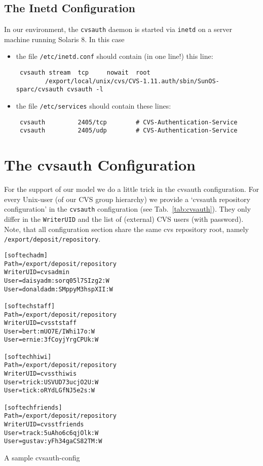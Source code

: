 \subsection{The Inetd Configuration}
In our environment, the \texttt{cvsauth} daemon is started via \texttt{inetd} on 
a server machine running Solaris 8. In this case
\begin{itemize}
 \item the file \verb|/etc/inetd.conf| should contain (in one line!) this line:
 {\footnotesize
 \begin{verbatim}
 cvsauth stream  tcp     nowait  root 
        /export/local/unix/cvs/CVS-1.11.auth/sbin/SunOS-sparc/cvsauth cvsauth -l
 \end{verbatim}
 }
 \item the file \verb|/etc/services| should contain these lines:
 {\footnotesize
 \begin{verbatim}
 cvsauth         2405/tcp        # CVS-Authentication-Service
 cvsauth         2405/udp        # CVS-Authentication-Service
 \end{verbatim}
 } 
 \end{itemize}

\section{The cvsauth Configuration}
For the support of our \rbac{} model we do a little trick in the cvsauth configuration. For every 
Unix-user (of our CVS group hierarchy) we provide a `cvsauth repository configuration' in the 
\texttt{cvsauth} configuration (see Tab.~\ref{tab:cvsauth}). They only differ in the \texttt{WriterUID} and the list of (external) CVS users (with password). Note, that all configuration section share the same cvs repository root, namely \verb|/export/deposit/repository|.
\begin{table}
{\small
\begin{verbatim}
[softechadm]
Path=/export/deposit/repository
WriterUID=cvsadmin
User=daisyadm:sorq05l7SIzg2:W
User=donaldadm:SMppyM3hspXII:W

[softechstaff]
Path=/export/deposit/repository
WriterUID=cvsststaff
User=bert:mUO7E/IWhi17o:W
User=ernie:3fCoyjYrgCPUk:W

[softechhiwi]
Path=/export/deposit/repository
WriterUID=cvssthiwis
User=trick:USVUD73ucjO2U:W
User=tick:oRYdLGfNJ5e2s:W

[softechfriends]
Path=/export/deposit/repository
WriterUID=cvsstfriends
User=track:5uAho6c6qjOlk:W
User=gustav:yFh34gaCS82TM:W
\end{verbatim}
}
\caption{A sample cvsauth-config\label{tab:cvsauth}}
\end{table}

